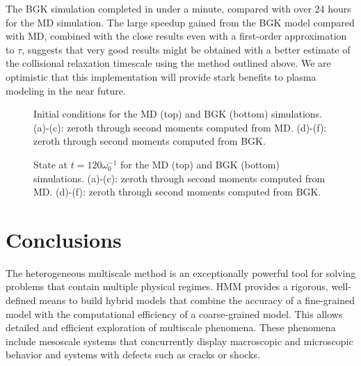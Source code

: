 \documentclass{article}
\begin{document}
The BGK simulation completed in under a minute, compared with over 24 hours for the MD simulation. The large speedup gained from the BGK model compared with MD, combined with the close results even with a first-order approximation to $\tau$, suggests that very good results might be obtained with a better estimate of the collisional relaxation timescale using the method outlined above. We are optimistic that this implementation will provide stark benefits to plasma modeling in the near future.
\begin{figure}[h]
	\caption{Initial conditions for the MD (top) and BGK (bottom) simulations. (a)-(c): zeroth through second moments computed from MD. (d)-(f): zeroth through second moments computed from BGK.}
	\label{Results0}
\end{figure}
\begin{figure}[h]
	\caption{State at $t=120\omega_0^{-1}$ for the MD (top) and BGK (bottom) simulations. (a)-(c): zeroth through second moments computed from MD. (d)-(f): zeroth through second moments computed from BGK.}
	\label{ResultsEnd}
\end{figure}



\section{Conclusions}

The heterogeneous multiscale method is an exceptionally powerful tool for solving problems that contain multiple physical regimes. HMM provides a rigorous, well-defined means to build hybrid models that combine the accuracy of a fine-grained model with the computational efficiency of a coarse-grained model. This allows detailed and efficient exploration of multiscale phenomena. These phenomena include mesoscale systems that concurrently display macroscopic and microscopic behavior and systems with defects such as cracks or shocks.
\end{document}
